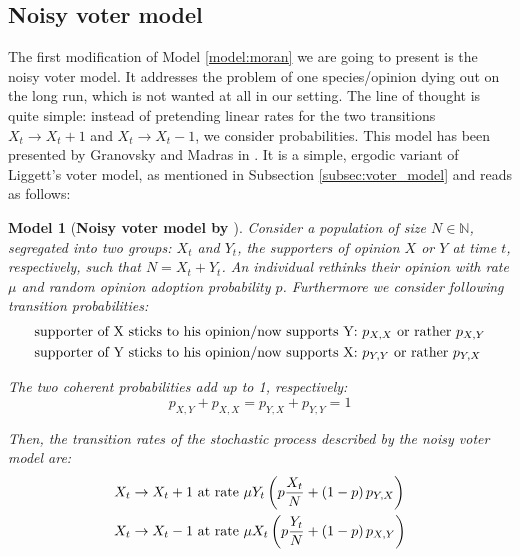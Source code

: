 \documentclass[12pt,a4paper,twoside]{article}
\newtheorem{model}{Model}[section]
\begin{document}
\subsection{Noisy voter model}\label{subsec:noisy_voter_model}
The first modification of Model \ref{model:moran} we are going to present is the noisy voter model. It addresses the problem of one species/opinion dying out on the long run, which is not wanted at all in our setting. The line of thought is quite simple: instead of pretending linear rates for the two transitions $X_t \rightarrow X_t + 1$ and $X_t \rightarrow X_t - 1$, we consider probabilities. This model has been presented by Granovsky and Madras in \cite{Granovsky1995}. It is a simple, ergodic variant of Liggett's voter model, as mentioned in Subsection \ref{subsec:voter_model} and reads as follows:
\begin{model}[\textbf{Noisy voter model by \cite{Granovsky1995}}]\label{model:noisy_voter_model}
	Consider a population of size $N \in \mathbb{N}$, segregated into two groups: $X_t$ and $Y_t$, the supporters of opinion $X$ or $Y$ at time $t$, respectively, such that $N = X_t + Y_t$. An individual rethinks their opinion with rate $\mu$ and random opinion adoption probability $p$. Furthermore we consider following transition probabilities:
	\begin{align}
	\begin{split}\label{def:noisy_probs}
		\textnormal{supporter of X sticks to his opinion/now supports Y:} &\textnormal{  } p_{X,X}\textnormal{ or rather }p_{X,Y}\\
		\textnormal{supporter of Y sticks to his opinion/now supports X:} &\textnormal{  } p_{Y,Y}\textnormal{ or rather }p_{Y,X}
	\end{split}
	\end{align}
	
	The two coherent probabilities add up to 1, respectively:
	\begin{equation}\label{eq:noisy_probs_add_to_1}
		p_{X,Y} + p_{X,X} = p_{Y,X} + p_{Y,Y} = 1
	\end{equation}
	
	 Then, the transition rates of the stochastic process described by the noisy voter model are:
	 \begin{align}\label{def:transition_rates_noisy_voter_model}
	 	\begin{split}
	 	X_t \rightarrow X_t + 1 & \textnormal{ at rate } \mu Y_t\left(p\frac{X_t}{N} + \left(1-p\right) p_{Y,X}\right)\\
	 	X_t \rightarrow X_t - 1 & \textnormal{ at rate } \mu X_t\left(p\frac{Y_t}{N} + \left(1-p\right)p_{X,Y}\right)
	 	\end{split}
	 \end{align}
\end{model}
\end{document}
